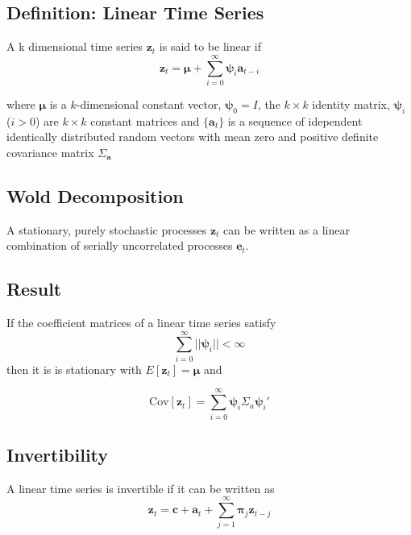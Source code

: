 \documentclass{article}
\begin{document}
        \subsection{Definition: Linear Time Series}
            A k dimensional time series $\bm{z}_t$ is said to be linear
            if
            \begin{equation}
                 \bm{z}_t = \bm{\mu} + \sum_{i=0}^\infty \bm{\psi}_i \bm{a}_{t-i}
            \end{equation}

            where $\bm{\mu}$ is a $k$-dimensional constant vector, 
            $\bm{\psi}_0 = I$, the $k \times k$
            identity matrix, $\bm{\psi}_i$ ($i > 0$) are $k \times k$
            constant matrices and $\{\bm{a}_t\}$ is a sequence of 
            idependent identically distributed random vectors with
            mean zero and positive definite covariance matrix $\Sigma_{\bm{a}}$


        \subsection{Wold Decomposition}
            A stationary, purely stochastic processes $\bm{z}_t$ can
            be written as a linear combination of serially uncorrelated
            processes $\bm{e}_t$.

        \subsection{Result}
            If the coefficient matrices of a linear time series
            satisfy
            \[\sum_{i=0}^\infty ||\bm{\psi}_i|| < \infty \]
            then it is is stationary  with $E[\bm{z}_t] = \bm{\mu}$ and

            \begin{equation}
                \text{Cov}[\bm{z}_t] = \sum_{i=0}^\infty 
                \bm{\psi}_i \Sigma_a \bm{\psi}_i'
            \end{equation}

        \subsection{Invertibility}
            A linear time series is invertible if it can be 
            written as
            \begin{equation}
                \bm{z}_t = \bm{c} + \bm{a}_t 
                + \sum_{j=1}^\infty \bm{\pi}_j \bm{z}_{t-j}
            \end{equation}
\end{document}
